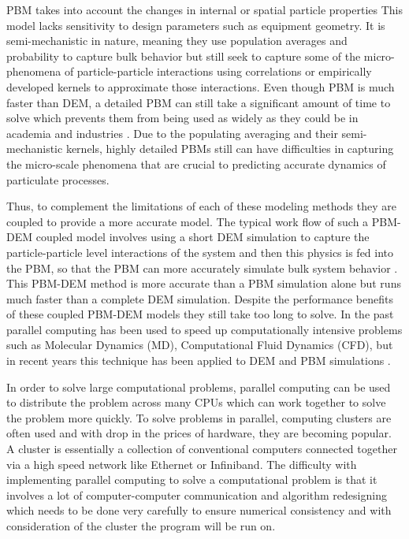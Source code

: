 \documentclass[preprint,11pt,authoryear]{elsarticle}
\begin{document}
PBM takes into account the changes in internal or spatial particle properties 
This 
model lacks sensitivity to design parameters such as equipment geometry. It is semi-mechanistic in 
nature, meaning they use population averages and probability to capture bulk behavior but still 
seek to capture some of the micro-phenomena of particle-particle interactions using correlations or 
empirically developed kernels to approximate those interactions. Even though PBM is much faster 
than DEM, a detailed PBM can still take a significant amount of time to solve which prevents them 
from being used as widely as they could be in academia and industries \citep{Barrasso2013}. Due to the 
populating averaging and their semi-mechanistic kernels, highly detailed PBMs still can have 
difficulties in capturing the micro-scale phenomena that are crucial to predicting accurate dynamics of 
particulate processes. 

Thus, to complement the limitations of each of these modeling methods they are coupled to 
provide a more accurate model.  The typical work flow of such a PBM-DEM coupled model involves 
using a short DEM simulation to capture the particle-particle level interactions of the system and 
then this physics is fed into the PBM, so that the PBM can more accurately simulate bulk system 
behavior \citep{Goldschmidt2003} \citep{Reinhold2012}\citep{Barrasso2013}. This PBM-DEM 
method is more accurate than a PBM simulation alone but runs much faster than a complete DEM 
simulation. Despite the performance benefits of these coupled PBM-DEM models they still take too 
long to solve. In the past parallel computing has been used to speed up computationally intensive 
problems such as Molecular Dynamics (MD), Computational Fluid Dynamics (CFD), but in recent 
years  this technique has been applied to DEM and PBM simulations 
\citep{Bettencourt2017}\citep{Prakash2013a}\citep{Gunawan2008}.

In order to solve large computational problems, parallel computing can be used to distribute the 
problem across many CPUs which can work together to solve the problem more quickly. To solve 
problems in parallel, computing clusters are often used and with drop  in the prices of hardware, 
they are becoming popular. A cluster is essentially a collection of conventional computers 
connected together via a high speed network like Ethernet or Infiniband. The difficulty with 
implementing parallel computing to solve a computational problem is that it involves a lot of 
computer-computer communication and algorithm redesigning which needs to be done very 
carefully to ensure numerical consistency and with consideration of the cluster the program will be 
run on.
\end{document}
